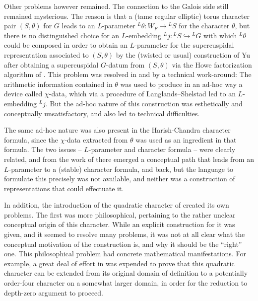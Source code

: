 \documentclass{article}
\theoremstyle{definition}
\numberwithin{equation}{subsection}
\renewcommand{\-}{\hyp{}}
\begin{document}
Other problems however remained. The connection to the Galois side still remained mysterious. The reason is that a (tame regular elliptic) torus character pair $(S,\theta)$ for $G$ leads to an $L$-parameter $^L\theta : W_F \to {^LS}$ for the character $\theta$, but there is no distinguished choice for an $L$-embedding ${^Lj} : {^LS} \hookrightarrow {^LG}$ with which $^L\theta$ could be composed in order to obtain an $L$-parameter for the supercuspidal representation associated to $(S,\theta)$ by the (twisted or usual) construction of Yu after obtaining a supercuspidal $G$-datum from $(S,\theta)$ via the Howe factorization algorithm of \cite[\S3.6]{KalRSP}. This problem was resolved in \cite{KalRSP} and \cite{KalSLP} by a technical work-around: The arithmetic information contained in $\theta$ was used to produce in an ad-hoc way a device called $\chi$-data, which via a procedure of Langlands--Shelstad \cite[\S2.6]{LS87} led to an $L$-embedding $^Lj$. But the ad-hoc nature of this construction was esthetically and conceptually unsatisfactory, and also led to technical difficulties.

The same ad-hoc nature was also present in the Harish-Chandra character formula, since the $\chi$-data extracted from $\theta$ was used as an ingredient in that formula. The two issues -- $L$-parameter and character formula -- were clearly related, and from the work of \cite{KalRSP} there emerged a conceptual path that leads from an $L$-parameter to a (stable) character formula, and back, but the language to formulate this precisely was not available, and neither was a construction of representations that could effectuate it.

In addition, the introduction of the quadratic character of \cite{FKS23} created its own problems. The first was more philosophical, pertaining to the rather unclear conceptual origin of this character. While an explicit construction for it was given, and it seemed to resolve many problems, it was not at all clear what the conceptual motivation of the construction is, and why it should be the ``right'' one. This philosophical problem had concrete mathematical manifestations. For example, a great deal of effort in \cite{AFMO2} was expended to prove that this quadratic character can be extended from its original domain of definition to a potentially order-four character on a somewhat larger domain, in order for the reduction to depth-zero argument to proceed. 
\end{document}

